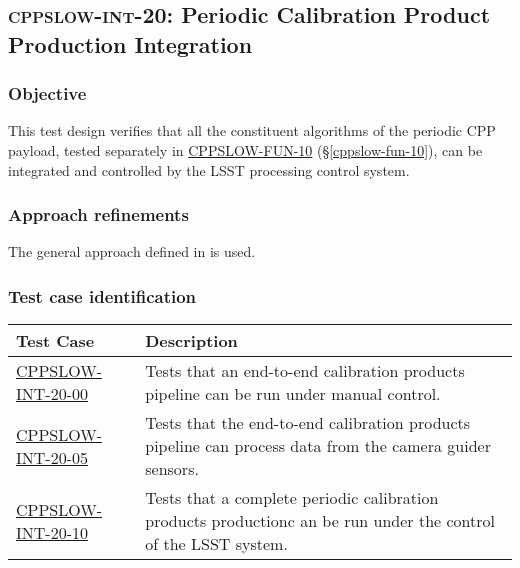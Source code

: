 \subsection{\textsc{cppslow-int-20}: Periodic Calibration Product Production Integration}
\label{cppslow-int-20}

\subsubsection{Objective}

This test design verifies that all the constituent algorithms of the periodic
CPP payload, tested separately in \hyperref[cppslow-fun-10]{CPPSLOW-FUN-10}
(\S\ref{cppslow-fun-10}), can be integrated and controlled by the LSST
processing control system.

\subsubsection{Approach refinements}

The general approach defined in  is used.

\subsubsection{Test case identification}

\begin{longtable} {|p{}|p{}|}\hline
\textbf{Test Case}  & \textbf{Description} \\\hline

\hyperref[cppslow-int-20-00]{CPPSLOW-INT-20-00} & Tests that an end-to-end calibration products pipeline can be run under manual control.\\\hline
\hyperref[cppslow-int-20-05]{CPPSLOW-INT-20-05} & Tests that the end-to-end calibration products pipeline can process data from the camera guider sensors.\\\hline
\hyperref[cppslow-int-20-10]{CPPSLOW-INT-20-10} & Tests that a complete periodic calibration products productionc an be run under the control of the LSST system.\\\hline
\end{longtable}
